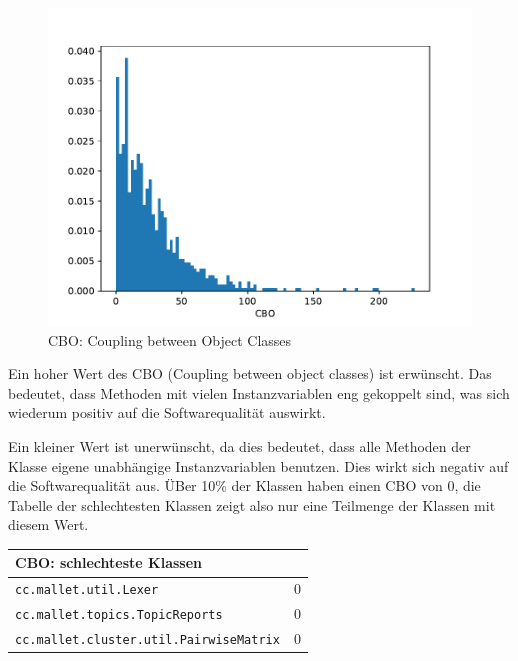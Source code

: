 \documentclass{scrreprt}
\newcommand{\lstx}[1]{\lstinline$#1$}
\begin{document}
\begin{figure}
 \centering
 \includegraphics[width=.8\textwidth]{./CBO.pdf}
 \caption{CBO: Coupling between Object Classes}
 \label{abb:cbo}
\end{figure}

Ein hoher Wert des CBO (Coupling between object classes) ist erwünscht. Das bedeutet, dass Methoden mit vielen Instanzvariablen eng gekoppelt sind, was sich wiederum positiv auf die Softwarequalität auswirkt.




Ein kleiner Wert ist unerwünscht, da dies bedeutet, dass alle Methoden der Klasse eigene unabhängige Instanzvariablen benutzen. Dies wirkt sich negativ auf die Softwarequalität aus. ÜBer 10\% der Klassen haben einen CBO von 0, die Tabelle der schlechtesten Klassen zeigt also nur eine Teilmenge der Klassen mit diesem Wert.



\begin{center}
\begin{tabular}{ll}
\toprule
CBO: schlechteste Klassen\\
\midrule
\lstx{cc.mallet.util.Lexer} & 0\\
\lstx{cc.mallet.topics.TopicReports} & 0\\
\lstx{cc.mallet.cluster.util.PairwiseMatrix} & 0 \\
\bottomrule
\end{tabular}
\end{center}
\end{document}
